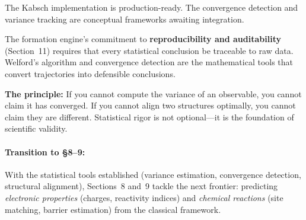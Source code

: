 \documentclass[11pt]{article}
\begin{document}
The Kabsch implementation is production-ready. The convergence detection and variance tracking are conceptual frameworks awaiting integration.

The formation engine's commitment to \textbf{reproducibility and auditability} (Section~11) requires that every statistical conclusion be traceable to raw data. Welford's algorithm and convergence detection are the mathematical tools that convert trajectories into defensible conclusions.

\textbf{The principle:} If you cannot compute the variance of an observable, you cannot claim it has converged. If you cannot align two structures optimally, you cannot claim they are different. Statistical rigor is not optional---it is the foundation of scientific validity.

\paragraph{Transition to \S8--9:} With the statistical tools established (variance estimation, convergence detection, structural alignment), Sections~8 and~9 tackle the next frontier: predicting \textit{electronic properties} (charges, reactivity indices) and \textit{chemical reactions} (site matching, barrier estimation) from the classical framework.
\end{document}
